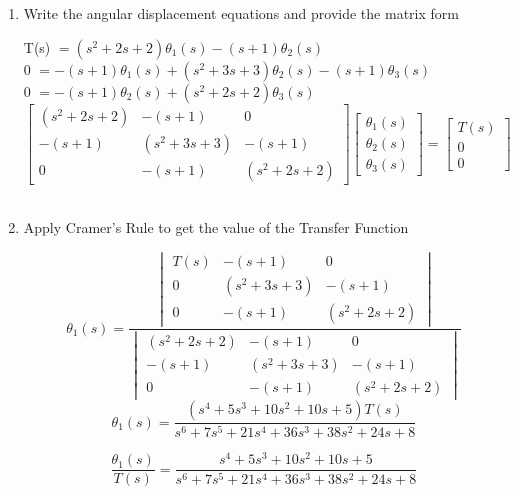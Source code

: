 \begin{fold}
\begin{enumerate}[label=(\alph*),itemindent=*, itemindent=*, leftmargin=*, nolistsep]
		\item Write the angular displacement equations and provide the matrix form
\begin{center}
	T(s) $= (s^2+2s+2)\theta_1(s) - (s+1)\theta_2(s)$\\
	0 $= -(s+1)\theta_1(s) + (s^2+3s+3)\theta_2(s) - (s+1)\theta_3(s)$\\
    0 $= -(s+1)\theta_2(s) + (s^2 + 2s + 2)\theta_3(s) $
	\[
		\begin{bmatrix}
		(s^2 + 2s + 2) & -(s+1) & 0\\
		-(s+1) & (s^2 + 3s + 3) & -(s+1)\\
        0 & -(s+1) & (s^2 + 2s + 2)
		\end{bmatrix}
		\begin{bmatrix}
		\theta_1(s) \\
		\theta_2(s) \\ 
        \theta_3(s)
		\end{bmatrix}
		=
		\begin{bmatrix}
		T(s)\\
		0 \\
        0
		\end{bmatrix}
	\]\\
\end{center}
		\item Apply Cramer's Rule to get the value of the Transfer Function
\begin{center}
	\[
		\theta_1(s) = 
			\frac{\begin{vmatrix}
				T(s) & -(s+1) & 0\\
		          0 & (s^2 + 3s + 3) & -(s+1)\\
                0 & -(s+1) & (s^2 + 2s + 2)
			\end{vmatrix}
		}{\begin{vmatrix}
				(s^2 + 2s + 2) & -(s+1) & 0\\
		          -(s+1) & (s^2 + 3s + 3) & -(s+1)\\
                0 & -(s+1) & (s^2 + 2s + 2)
			\end{vmatrix}
		}
	\]
	\[
	\theta_1(s) = \frac{(s^4 + 5s^3 + 10s^2 + 10s + 5)T(s)}{s^6 + 7s^5 + 21s^4 + 36s^3 + 38s^2 + 24s + 8}
	\] 

	\[
	\boxed{\frac{\theta_1(s)}{T(s)} = \frac{s^4 + 5s^3 + 10s^2 + 10s + 5}{s^6 + 7s^5 + 21s^4 + 36s^3 + 38s^2 + 24s + 8}}
	\]
\end{center}
	\end{enumerate}


\end{fold}

